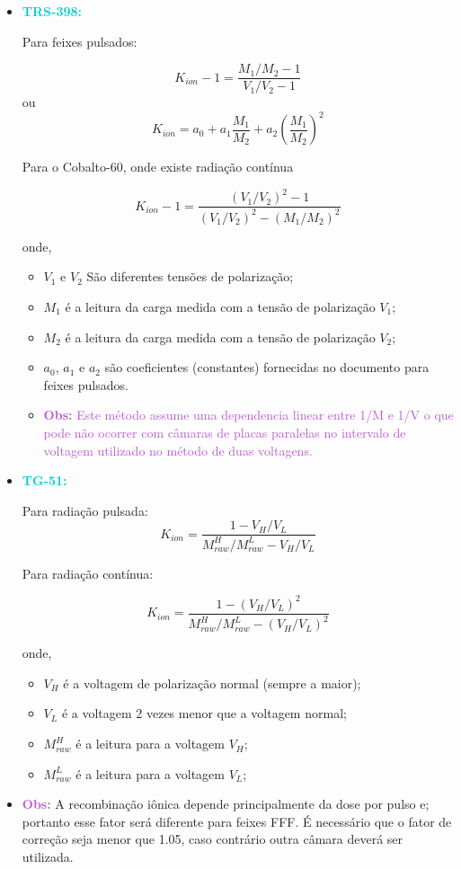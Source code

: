 \documentclass[11pt,a4paper]{article}
\newcounter{exemplo}
\begin{document}
	\begin{exemplo}
		\begin{itemize}
			\item \textcolor{DarkTurquoise}{\Large\LobsterTwo\textbf{TRS-398:}}
			
			Para feixes pulsados:

				$$K_{ion} - 1 = \frac{M_1/M_2 - 1}{V_1/V_2 - 1}$$
			ou
				$$K_{ion} = a_0 + a_1\frac{M_1}{M_2} + a_2\left(\frac{M_1}{M_2}\right)^2$$

			Para o Cobalto-60, onde existe radiação contínua

				$$K_{ion} - 1 = \frac{(V_1/V_2)^2- 1}{(V_1/V_2)^2 - (M_1/M_2)^2}$$

			onde,
			\begin{itemize}[label=\textcolor{CarnationPink}{$\star$}]
				\item $V_1$ e $V_2$ São diferentes tensões de polarização;
				\item $M_1$ é a leitura da carga medida com a tensão de polarização $V_1$;
				\item $M_2$ é a leitura da carga medida com a tensão de polarização $V_2$;
				\item $a_0$, $a_1$ e $a_2$ são coeficientes (constantes) fornecidas no documento para feixes pulsados.
				\item \textcolor{MediumOrchid}{\textbf{Obs:} Este método assume uma dependencia linear entre 1/M e 1/V o que pode não ocorrer com câmaras de placas paralelas no intervalo de voltagem utilizado no método de duas voltagens.}
			\end{itemize}

			\item \textcolor{DarkTurquoise}{\Large\LobsterTwo\textbf{TG-51:}}
			
			Para radiação pulsada:
				$$K_{ion} = \frac{1 - V_H/V_L}{M_{raw}^H/M_{raw}^L - V_H/V_L}$$

			Para radiação contínua:

				$$K_{ion} = \frac{1 - (V_H/V_L)^2}{M_{raw}^H/M_{raw}^L - (V_H/V_L)^2}$$

			onde,
			\begin{itemize}[label=\textcolor{CarnationPink}{$\star$}]
				\item $V_H$ é a voltagem de polarização normal (sempre a maior);
				\item $V_L$ é a voltagem 2 vezes menor que a voltagem normal;
				\item $M_{raw}^H$ é a leitura para a voltagem $V_H$;
				\item $M_{raw}^L$ é a leitura para a voltagem $V_L$;
			\end{itemize}

			\item \textcolor{MediumOrchid}{\textbf{Obs:}} A recombinação iônica depende principalmente da dose por pulso e; portanto esse fator será diferente para feixes FFF. É necessário que o fator de correção seja menor que 1.05, caso contrário outra câmara deverá ser utilizada.
		\end{itemize}
	\end{exemplo}
\end{document}
